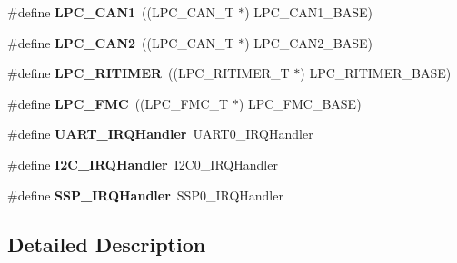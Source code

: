 \begin{DoxyCompactItemize}
\item 
\hypertarget{group___p_e_r_i_p_h__175_x__6_x___b_a_s_e_ga2f006d6888921f8336dce504eb56f4aa}{\#define {\bfseries L\+P\+C\+\_\+\+C\+A\+N1}~((L\+P\+C\+\_\+\+C\+A\+N\+\_\+\+T              $\ast$) L\+P\+C\+\_\+\+C\+A\+N1\+\_\+\+B\+A\+S\+E)}\label{group___p_e_r_i_p_h__175_x__6_x___b_a_s_e_ga2f006d6888921f8336dce504eb56f4aa}

\item 
\hypertarget{group___p_e_r_i_p_h__175_x__6_x___b_a_s_e_ga838776140ad5e0156715278f8bb0652d}{\#define {\bfseries L\+P\+C\+\_\+\+C\+A\+N2}~((L\+P\+C\+\_\+\+C\+A\+N\+\_\+\+T              $\ast$) L\+P\+C\+\_\+\+C\+A\+N2\+\_\+\+B\+A\+S\+E)}\label{group___p_e_r_i_p_h__175_x__6_x___b_a_s_e_ga838776140ad5e0156715278f8bb0652d}

\item 
\hypertarget{group___p_e_r_i_p_h__175_x__6_x___b_a_s_e_gadf02cb70e7eb1a9e85e2b84ec1537fee}{\#define {\bfseries L\+P\+C\+\_\+\+R\+I\+T\+I\+M\+E\+R}~((L\+P\+C\+\_\+\+R\+I\+T\+I\+M\+E\+R\+\_\+\+T          $\ast$) L\+P\+C\+\_\+\+R\+I\+T\+I\+M\+E\+R\+\_\+\+B\+A\+S\+E)}\label{group___p_e_r_i_p_h__175_x__6_x___b_a_s_e_gadf02cb70e7eb1a9e85e2b84ec1537fee}

\item 
\hypertarget{group___p_e_r_i_p_h__175_x__6_x___b_a_s_e_ga406fa416fe50b196b86146ba0b20ba3c}{\#define {\bfseries L\+P\+C\+\_\+\+F\+M\+C}~((L\+P\+C\+\_\+\+F\+M\+C\+\_\+\+T              $\ast$) L\+P\+C\+\_\+\+F\+M\+C\+\_\+\+B\+A\+S\+E)}\label{group___p_e_r_i_p_h__175_x__6_x___b_a_s_e_ga406fa416fe50b196b86146ba0b20ba3c}

\item 
\hypertarget{group___p_e_r_i_p_h__175_x__6_x___b_a_s_e_gaf6a20f8c9320377f3713d96ea90bfd10}{\#define {\bfseries U\+A\+R\+T\+\_\+\+I\+R\+Q\+Handler}~U\+A\+R\+T0\+\_\+\+I\+R\+Q\+Handler}\label{group___p_e_r_i_p_h__175_x__6_x___b_a_s_e_gaf6a20f8c9320377f3713d96ea90bfd10}

\item 
\hypertarget{group___p_e_r_i_p_h__175_x__6_x___b_a_s_e_ga78bc9c1986ea5da20688e1db532c5717}{\#define {\bfseries I2\+C\+\_\+\+I\+R\+Q\+Handler}~I2\+C0\+\_\+\+I\+R\+Q\+Handler}\label{group___p_e_r_i_p_h__175_x__6_x___b_a_s_e_ga78bc9c1986ea5da20688e1db532c5717}

\item 
\hypertarget{group___p_e_r_i_p_h__175_x__6_x___b_a_s_e_gac4eb0fc5d2f19b89fa77194876b63df4}{\#define {\bfseries S\+S\+P\+\_\+\+I\+R\+Q\+Handler}~S\+S\+P0\+\_\+\+I\+R\+Q\+Handler}\label{group___p_e_r_i_p_h__175_x__6_x___b_a_s_e_gac4eb0fc5d2f19b89fa77194876b63df4}

\end{DoxyCompactItemize}


\subsection{Detailed Description}
